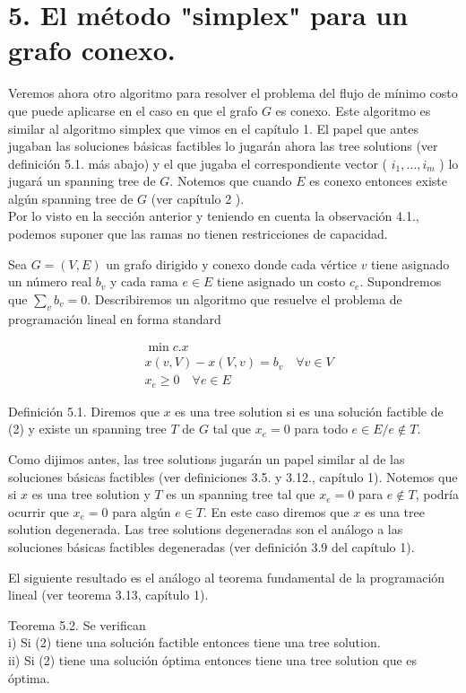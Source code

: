 \documentclass[10pt]{article}
\begin{document}
\section*{5. El método "simplex" para un grafo conexo.}
Veremos ahora otro algoritmo para resolver el problema del flujo de mínimo costo que puede aplicarse en el caso en que el grafo $G$ es conexo. Este algoritmo es similar al algoritmo simplex que vimos en el capítulo 1. El papel que antes jugaban las soluciones básicas factibles lo jugarán ahora las tree solutions (ver definición 5.1. más abajo) y el que jugaba el correspondiente vector ( $i_{1}, \ldots, i_{m}$ ) lo jugará un spanning tree de $G$. Notemos que cuando $E$ es conexo entonces existe algún spanning tree de $G$ (ver capítulo 2 ).\\
Por lo visto en la sección anterior y teniendo en cuenta la observación 4.1., podemos suponer que las ramas no tienen restricciones de capacidad.

Sea $G=(V, E)$ un grafo dirigido y conexo donde cada vértice $v$ tiene asignado un número real $b_{v}$ y cada rama $e \in E$ tiene asignado un costo $c_{e}$. Supondremos que $\sum_{v} b_{v}=0$. Describiremos un algoritmo que resuelve el problema de programación lineal en forma standard


\begin{align*}
& \min c . x \\
& x(v, V)-x(V, v)=b_{v} \quad \forall v \in V  \tag{2}\\
& x_{e} \geq 0 \quad \forall e \in E
\end{align*}


Definición 5.1. Diremos que $x$ es una tree solution si es una solución factible de (2) y existe un spanning tree $T$ de $G$ tal que $x_{e}=0$ para todo $e \in E / e \notin T$.

Como dijimos antes, las tree solutions jugarán un papel similar al de las soluciones básicas factibles (ver definiciones 3.5. y 3.12., capítulo 1). Notemos que si $x$ es una tree solution y $T$ es un spanning tree tal que $x_{e}=0$ para $e \notin T$, podría ocurrir que $x_{e}=0$ para algún $e \in T$. En este caso diremos que $x$ es una tree solution degenerada. Las tree solutions degeneradas son el análogo a las soluciones básicas factibles degeneradas (ver definición 3.9 del capítulo 1).

El siguiente resultado es el análogo al teorema fundamental de la programación lineal (ver teorema 3.13, capítulo 1).

Teorema 5.2. Se verifican\\
i) Si (2) tiene una solución factible entonces tiene una tree solution.\\
ii) Si (2) tiene una solución óptima entonces tiene una tree solution que es óptima.
\end{document}
